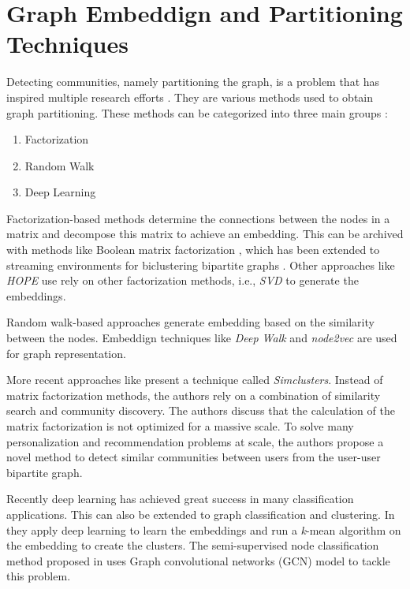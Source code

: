 \section{Graph Embeddign and Partitioning Techniques}
\label{sec:graph-partitioning-techniques}
Detecting communities, namely partitioning the graph, is a problem that has inspired multiple research efforts \cite{fortunato2010community}. They are various methods used to obtain graph partitioning. These methods can be categorized into three main groups \cite{goyal2018graph}:

\begin{enumerate}
    \item Factorization
    \item Random Walk
    \item Deep Learning
\end{enumerate}


Factorization-based methods determine the connections between the nodes in a matrix and decompose this matrix to achieve an embedding. This can be archived with methods like Boolean matrix factorization \cite{miettinen2011model}, which has been extended to streaming environments for biclustering bipartite graphs \cite{neumann2020biclustering}. Other approaches like \emph{HOPE} \cite{ou2016asymmetric} use rely on other factorization methods, i.e., \emph{SVD} \cite{van1976generalizing} to generate the embeddings.


Random walk-based approaches generate embedding based on the similarity between the nodes. Embeddign techniques like \emph{Deep Walk} \cite{perozzi2014deepwalk} and \emph{node2vec} \cite{grover2016node2vec} are used for graph representation.


More recent approaches like \cite{satuluri2020simclusters} present a technique called \emph{Simclusters}. Instead of matrix factorization methods, the authors rely on a combination of similarity search
and community discovery. The authors discuss that the calculation of the matrix factorization is not optimized for a massive scale. To solve many personalization and recommendation problems at scale, the authors propose a novel method to detect similar communities between users from the user-user bipartite graph.


Recently deep learning has achieved great success in many classification applications. This can also be extended to graph classification and clustering. In \cite{tian2014learning} they apply deep learning to learn the embeddings and run a \emph{k}-mean algorithm on the embedding to create the clusters. The semi-supervised node classification method proposed in \cite{kipf2016semi} uses Graph convolutional networks (GCN) model to tackle this problem. 

